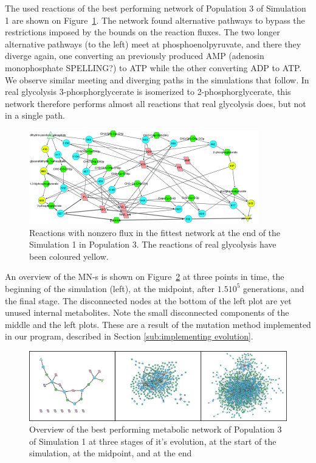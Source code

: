 \documentclass[a4paper,12pt]{article}
\begin{document}
The used reactions of the best performing network of Population 3 of Simulation 1 are shown on Figure~\ref{fig:trunk_glyc_final_job1}. The network found alternative pathways to bypass the restrictions imposed by the bounds on the reaction fluxes. The two longer alternative pathways (to the left) meet at phosphoenolpyruvate, and there they diverge again, one converting an previously produced AMP (adenosin monophosphate SPELLING?) to ATP while the other converting ADP to ATP. We observe similar meeting and diverging paths in the simulations that follow. In real glycolysis 3-phosphorglycerate is isomerized to 2-phosphorglycerate, this network therefore performs almost all reactions that real glycolysis does, but not in a single path. 



\begin{figure}[htpb]
	\centering
	\includegraphics[width=1\linewidth]{trunk_glyc_final_job1_colored.pdf}
	\caption{Reactions with nonzero flux in the fittest network at the end of the Simulation 1 in Population 3. The reactions of real glycolysis have been coloured yellow. }
	\label{fig:trunk_glyc_final_job1}
\end{figure}


An overview of the MN-s is shown on Figure~\ref{fig:init-mid-final} at three points in time, the beginning of the simulation (left), at the midpoint, after $1.5 10^5$ generations, and the final stage. The disconnected nodes at the bottom of the left plot are yet unused internal metabolites. Note the small disconnected components of the middle and the left plots. These are a result of the mutation method implemented in our program, described in Section \ref{sub:implementing evolution}. 

\begin{figure}[htpb]
	\centering
	\includegraphics[width=1\linewidth]{init-mid-final.png}
	\caption{Overview of the best performing metabolic network of Population 3 of Simulation 1 at three stages of it's evolution, at the start of the simulation, at the midpoint, and at the end}
	\label{fig:init-mid-final}
\end{figure}
\end{document}
